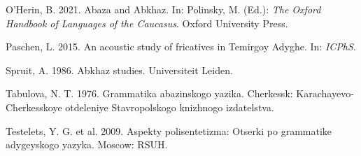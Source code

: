\documentclass[
]{article}
\newlength{\cslhangindent}
\newlength{\cslentryspacingunit} %
\newenvironment{CSLReferences}[2] %
 {%
  \setlength{\parindent}{0pt}
  \ifodd #1
  \let\oldpar\par
  \def\par{\hangindent=\cslhangindent\oldpar}
  \fi
  \setlength{\parskip}{#2\cslentryspacingunit}
 }%
 {}
\begin{document}
\begin{CSLReferences}{0}{0}
\leavevmode{}%
O'Herin, B. 2021. Abaza and {A}bkhaz. In: Polinsky, M. (Ed.): \emph{The
{O}xford {H}andbook of {L}anguages of the {C}aucasus}. Oxford University
Press.

\leavevmode{}%
Paschen, L. 2015. An acoustic study of fricatives in {T}emirgoy
{A}dyghe. In: \emph{ICPhS}.

\leavevmode{}%
Spruit, A. 1986. Abkhaz studies. Universiteit Leiden.

\leavevmode{}%
Tabulova, N. T. 1976. Grammatika abazinskogo yazika. Cherkessk:
Karachayevo-Cherkesskoye otdeleniye Stavropolskogo knizhnogo
izdatelstva.

\leavevmode{}%
Testelets, Y. G. et al. 2009. Aspekty polisentetizma: Otserki po
grammatike adygeyskogo yazyka. Moscow: RSUH.

\end{CSLReferences}
\end{document}
